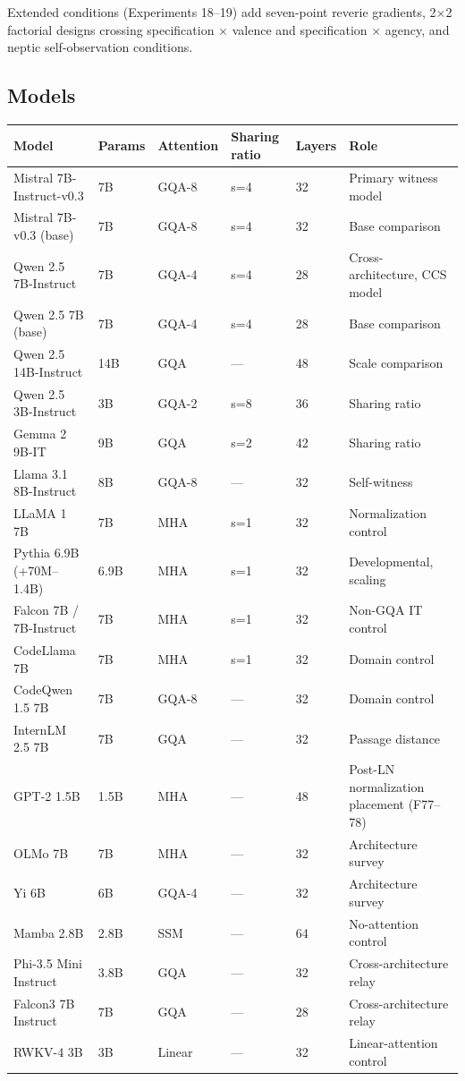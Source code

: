\documentclass[12pt]{article}
\begin{document}
Extended conditions (Experiments 18–19) add seven-point reverie gradients, 2×2 factorial designs crossing specification × valence and specification × agency, and neptic self-observation conditions.

\subsection{Models}

\begin{table}[h]
\centering
\small
\begin{tabular}{llllll}
\toprule
\textbf{Model} & \textbf{Params} & \textbf{Attention} & \textbf{Sharing ratio} & \textbf{Layers} & \textbf{Role} \\
\midrule
Mistral 7B-Instruct-v0.3 & 7B & GQA-8 & s=4 & 32 & Primary witness model \\
Mistral 7B-v0.3 (base) & 7B & GQA-8 & s=4 & 32 & Base comparison \\
Qwen 2.5 7B-Instruct & 7B & GQA-4 & s=4 & 28 & Cross-architecture, CCS model \\
Qwen 2.5 7B (base) & 7B & GQA-4 & s=4 & 28 & Base comparison \\
Qwen 2.5 14B-Instruct & 14B & GQA & — & 48 & Scale comparison \\
Qwen 2.5 3B-Instruct & 3B & GQA-2 & s=8 & 36 & Sharing ratio \\
Gemma 2 9B-IT & 9B & GQA & s=2 & 42 & Sharing ratio \\
Llama 3.1 8B-Instruct & 8B & GQA-8 & — & 32 & Self-witness \\
LLaMA 1 7B & 7B & MHA & s=1 & 32 & Normalization control \\
Pythia 6.9B (+70M–1.4B) & 6.9B & MHA & s=1 & 32 & Developmental, scaling \\
Falcon 7B / 7B-Instruct & 7B & MHA & s=1 & 32 & Non-GQA IT control \\
CodeLlama 7B & 7B & MHA & s=1 & 32 & Domain control \\
CodeQwen 1.5 7B & 7B & GQA-8 & — & 32 & Domain control \\
InternLM 2.5 7B & 7B & GQA & — & 32 & Passage distance \\
GPT-2 1.5B & 1.5B & MHA & — & 48 & Post-LN normalization placement (F77–78) \\
OLMo 7B & 7B & MHA & — & 32 & Architecture survey \\
Yi 6B & 6B & GQA-4 & — & 32 & Architecture survey \\
Mamba 2.8B & 2.8B & SSM & — & 64 & No-attention control \\
Phi-3.5 Mini Instruct & 3.8B & GQA & — & 32 & Cross-architecture relay \\
Falcon3 7B Instruct & 7B & GQA & — & 28 & Cross-architecture relay \\
RWKV-4 3B & 3B & Linear & — & 32 & Linear-attention control \\
\bottomrule
\end{tabular}
\end{table}
\end{document}
